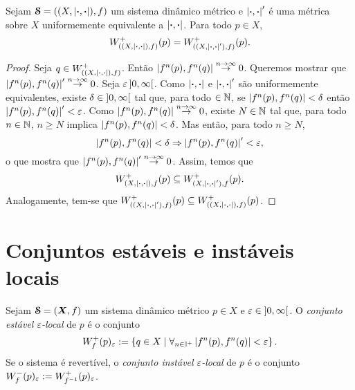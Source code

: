 \begin{proposition}
Sejam $\bm{\mathcal{S}}=((X,\left\vert{\bm{\cdot}},{\bm{\cdot}}\right\vert),f)$ um sistema dinâmico métrico e $\left\vert{\bm{\cdot}},{\bm{\cdot}}\right\vert'$ é uma métrica sobre $X$ uniformemente equivalente a $\left\vert{\bm{\cdot}},{\bm{\cdot}}\right\vert$. Para todo $p \in X$,
	\begin{equation*}
	W^+_{((X,\left\vert{\bm{\cdot}},{\bm{\cdot}}\right\vert),f)}(p) = W^+_{((X,\left\vert{\bm{\cdot}},{\bm{\cdot}}\right\vert'),f)}(p).
	\end{equation*}
\end{proposition}
\begin{proof}
Seja $q \in W^+_{((X,\left\vert{\bm{\cdot}},{\bm{\cdot}}\right\vert),f)}$. Então $\left\vert{f^n(p)},{f^n(q)}\right\vert \overset{n \rightarrow \infty}{\to} 0$. Queremos mostrar que $\left\vert{f^n(p)},{f^n(q)}\right\vert' \overset{n \rightarrow \infty}{\to} 0$. Seja $\varepsilon \left]{0},{\infty}\right[$. Como $\left\vert{\bm{\cdot}},{\bm{\cdot}}\right\vert$ e $\left\vert{\bm{\cdot}},{\bm{\cdot}}\right\vert'$ são uniformemente equivalentes, existe $\delta \in \left]{0},{\infty}\right[$ tal que, para todo $ \in \mathbb{N}$, se $\left\vert{f^n(p)},{f^n(q)}\right\vert < \delta$ então $\left\vert{f^n(p)},{f^n(q)}\right\vert' < \varepsilon$. Como $\left\vert{f^n(p)},{f^n(q)}\right\vert \overset{n \rightarrow \infty}{\to} 0$, existe $N \in \mathbb{N}$ tal que, para todo $n \in \mathbb{N}$, $n \geq N$ implica $\left\vert{f^n(p)},{f^n(q)}\right\vert < \delta$. Mas então, para todo $n \geq N$,
	\begin{equation*}
	\left\vert{f^n(p)},{f^n(q)}\right\vert < \delta \Rightarrow \left\vert{f^n(p)},{f^n(q)}\right\vert' < \varepsilon,
	\end{equation*}
o que mostra que $\left\vert{f^n(p)},{f^n(q)}\right\vert' \overset{n \rightarrow \infty}{\to} 0$. Assim, temos que
	\begin{equation*}
	W^+_{(X,\left\vert{\bm{\cdot}},{\bm{\cdot}}\right\vert),f}(p) \subseteq W^+_{(X,\left\vert{\bm{\cdot}},{\bm{\cdot}}\right\vert'),f}(p).
	\end{equation*}
Analogamente, tem-se que $W^+_{((X,\left\vert{\bm{\cdot}},{\bm{\cdot}}\right\vert'),f)}(p) \subseteq W^+_{((X,\left\vert{\bm{\cdot}},{\bm{\cdot}}\right\vert),f)}(p)$.
\end{proof}


\section{Conjuntos estáveis e instáveis locais}

\begin{definition}
Sejam $\bm{\mathcal{S}}=(\bm X,f)$ um sistema dinâmico métrico $p \in X$ e $\varepsilon \in \left]{0},{\infty}\right[$. O \emph{conjunto estável $\varepsilon$-local} de $p$ é o conjunto
	\begin{equation*}
	W^+_f(p)_\varepsilon := \left\{{q \in X}\;\middle\vert\;{\forall_{n \in \mathbb{I}^+} \left\vert{f^n(p)},{f^n(q)}\right\vert < \varepsilon}\right\}.
	\end{equation*}
Se o sistema é revertível, o \emph{conjunto instável $\varepsilon$-local} de $p$ é o conjunto $W^-_f(p)_\varepsilon := W^+_{f^{-1}}(p)_\varepsilon$.
\end{definition}

